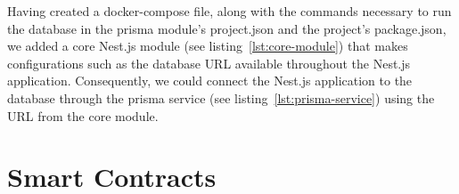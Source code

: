 
Having created a docker-compose file, along with the commands necessary to run the database in the prisma module’s project.json and the project’s package.json, we added a core Nest.js module (see listing~\ref{lst:core-module}) that makes configurations such as the database \gls{URL} available throughout the Nest.js application.
Consequently, we could connect the Nest.js application to the database through the prisma service (see listing~\ref{lst:prisma-service}) using the \gls{URL} from the core module.


\section{Smart Contracts}\label{sec:smart-contracts}
















